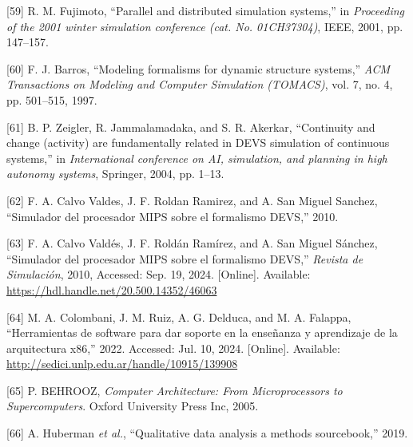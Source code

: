 \documentclass[12pt,oneside]{templates/unerthesis}
\newcommand{\CSLLeftMargin}[1]{#1} %
\newcommand{\CSLRightInline}[1]{#1} %
\newlength{\cslhangindent}
\newenvironment{CSLReferences}[2] %
 {\setlength{\parindent}{0pt}%
  \setlength{\leftskip}{#1 pt\relax}%
  \setlength{\parskip}{#2 pt\relax}%
  \everypar{\setlength{\hangindent}{\cslhangindent}}}
 {\par}
\begin{document}
\begin{CSLReferences}{0}{0}
\leavevmode{}%
\CSLLeftMargin{{[}59{]} }%
\CSLRightInline{R. M. Fujimoto, {``Parallel and distributed simulation systems,''} in \emph{Proceeding of the 2001 winter simulation conference (cat. No. 01CH37304)}, IEEE, 2001, pp. 147--157.}

\leavevmode{}%
\CSLLeftMargin{{[}60{]} }%
\CSLRightInline{F. J. Barros, {``Modeling formalisms for dynamic structure systems,''} \emph{ACM Transactions on Modeling and Computer Simulation (TOMACS)}, vol. 7, no. 4, pp. 501--515, 1997.}

\leavevmode{}%
\CSLLeftMargin{{[}61{]} }%
\CSLRightInline{B. P. Zeigler, R. Jammalamadaka, and S. R. Akerkar, {``Continuity and change (activity) are fundamentally related in DEVS simulation of continuous systems,''} in \emph{International conference on AI, simulation, and planning in high autonomy systems}, Springer, 2004, pp. 1--13.}

\leavevmode{}%
\CSLLeftMargin{{[}62{]} }%
\CSLRightInline{F. A. Calvo Valdes, J. F. Roldan Ramirez, and A. San Miguel Sanchez, {``Simulador del procesador MIPS sobre el formalismo DEVS,''} 2010.}

\leavevmode{}%
\CSLLeftMargin{{[}63{]} }%
\CSLRightInline{F. A. Calvo Valdés, J. F. Roldán Ramírez, and A. San Miguel Sánchez, {``Simulador del procesador {MIPS} sobre el formalismo {DEVS},''} \emph{Revista de Simulación}, 2010, Accessed: Sep. 19, 2024. {[}Online{]}. Available: \url{https://hdl.handle.net/20.500.14352/46063}}

\leavevmode{}%
\CSLLeftMargin{{[}64{]} }%
\CSLRightInline{M. A. Colombani, J. M. Ruiz, A. G. Delduca, and M. A. Falappa, {``Herramientas de software para dar soporte en la enseñanza y aprendizaje de la arquitectura x86,''} 2022. Accessed: Jul. 10, 2024. {[}Online{]}. Available: \url{http://sedici.unlp.edu.ar/handle/10915/139908}}

\leavevmode{}%
\CSLLeftMargin{{[}65{]} }%
\CSLRightInline{P. BEHROOZ, \emph{Computer {Architecture}: {From} {Microprocessors} to {Supercomputers}}. Oxford University Press Inc, 2005.}

\leavevmode{}%
\CSLLeftMargin{{[}66{]} }%
\CSLRightInline{A. Huberman \emph{et al.}, {``Qualitative data analysis a methods sourcebook,''} 2019.}


\end{CSLReferences}
\end{document}
